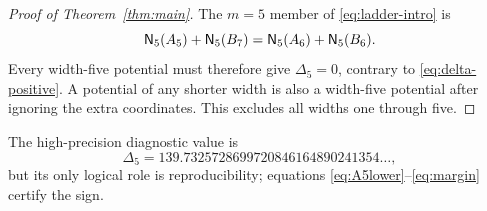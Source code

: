 \begin{proof}[Proof of Theorem~\ref{thm:main}]
The \(m=5\) member of \eqref{eq:ladder-intro} is
\[
 \mathsf N_5(A_5)+\mathsf N_5(B_7)=\mathsf N_5(A_6)+\mathsf N_5(B_6).
\]
Every width-five potential must therefore give \(\Delta_5=0\), contrary to
\eqref{eq:delta-positive}.  A potential of any shorter width is also a
width-five potential after ignoring the extra coordinates.  This excludes
all widths one through five.
\end{proof}

The high-precision diagnostic value is
\[
 \Delta_5=139.7325728699720846164890241354\ldots,
\]
but its only logical role is reproducibility; equations
\eqref{eq:A5lower}--\eqref{eq:margin} certify the sign.
